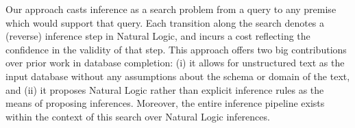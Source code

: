 
Our approach casts inference as a search problem from a query to any
  premise which would support that query.
Each transition along the search denotes a (reverse) inference step 
  in Natural Logic, and incurs a cost reflecting the confidence
  in the validity of that step.
This approach offers two big contributions over prior work in
  database completion:
  (i) it allows for unstructured text as the input database without
    any assumptions about the schema or domain of the text,
  and (ii) it proposes Natural Logic rather than explicit
    inference rules as the means of proposing inferences.
Moreover, the entire inference pipeline exists within the context
  of this search over Natural Logic inferences.

%
%

